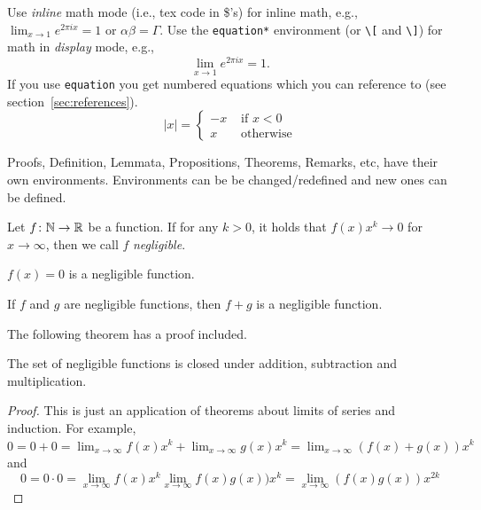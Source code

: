 \documentclass[11pt]{scrartcl}
\begin{document}
Use \emph{inline} math mode (i.e., tex code in \$'s) for inline math,
e.g., $\lim_{x \to 1} e^{2 \pi i x} = 1$ or $\alpha \beta = \Gamma$.
Use the \verb|equation*| environment (or \verb|\[| and \verb|\]|)
for math in \emph{display} mode, e.g.,
\begin{equation*}
\lim_{x \to 1} e^{2 \pi i x} = 1.
\end{equation*}
If you use \verb|equation| you get numbered equations which you can reference to (see section~\ref{sec:references}).
\begin{equation}
\label{eq:eqn}
|x| = \left\{
\begin{array}{rl}
-x &\mbox{ if $x<0$} \\
x &\mbox{ otherwise}
\end{array}
\right.
\end{equation}

Proofs, Definition, Lemmata, Propositions, Theorems, Remarks, etc, have their own environments.
Environments can be be changed/redefined and new ones can be defined.

\begin{definition}
	\label{def:negl}
	Let $f \colon \mathbb{N} \to \mathbb{R}$ be a function.
	If for any $k > 0$, it holds that $f(x) x^k \rightarrow 0$ for $x \to \infty$,
	then we call $f$ \emph{negligible}.
\end{definition}

\begin{lemma}
	$f(x) = 0$ is a negligible function.
\end{lemma}

\begin{proposition}
	If $f$ and $g$ are negligible functions,
	then $f + g$ is a negligible function.
\end{proposition}

The following theorem has a proof included.

\begin{theorem}
	The set of negligible functions is closed under addition, subtraction and multiplication.
\end{theorem}
\begin{proof}
	This is just an application of theorems about limits of series and induction.
	For example, $0 = 0 + 0 = \lim_{x \to \infty} f(x)x^k + \lim_{x \to \infty} g(x)x^k = \lim_{x \to \infty} (f(x) + g(x))x^k$
	and
	\begin{equation*}
	0 = 0 \cdot 0 = \lim_{x \to \infty} f(x) x^{k} \lim_{x \to \infty} f(x) g(x)) x^{k} = \lim_{x \to \infty} (f(x) g(x)) x^{2k}
	\end{equation*}
\end{proof}
\end{document}

